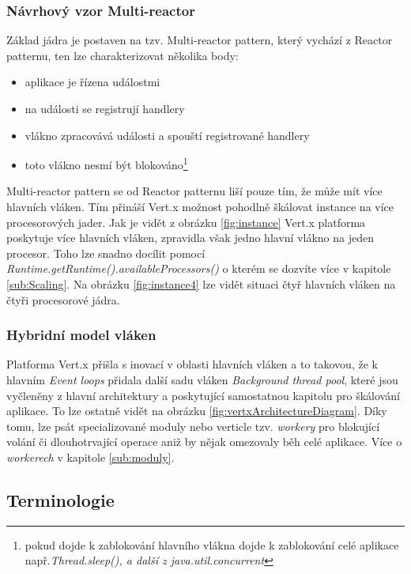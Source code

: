 \subsubsection{Návrhový vzor Multi-reactor}\label{sub:multireactor}

Základ jádra je postaven na tzv. Multi-reactor pattern\cite{eventLoops}, 
který vychází z Reactor patternu\cite{reactorPattern}, ten lze charakterizovat několika body:

\begin{itemize}
\item{aplikace je řízena událostmi}
\item{na události se registrují handlery}
\item{vlákno zpracovává události a spouští registrované handlery}
\item{toto vlákno nesmí být blokováno\footnote{pokud dojde k zablokování hlavního vlákna dojde k zablokování celé aplikace např.\emph{Thread.sleep(), a další z java.util.concurrent }}}
\end{itemize}

Multi-reactor pattern\cite{eventLoops} se od Reactor patternu liší pouze tím, že může mít více hlavních vláken. Tím přináší Vert.x možnost pohodlně škálovat instance na více procesorových jader. Jak je vidět z obrázku \vref{fig:instance} Vert.x platforma poskytuje více hlavních vláken, zpravidla však jedno hlavní vlákno na jeden procesor. Toho lze snadno docílit pomocí \emph{Runtime.getRuntime().availableProcessors()} o kterém se dozvíte více v kapitole \ref{sub:Scaling}. Na obrázku \vref{fig:instance4} lze vidět situaci čtyř hlavních vláken na čtyři procesorové jádra.

\subsubsection{Hybridní model vláken}\label{sub:hybrid}

Platforma Vert.x přišla s inovací v oblasti hlavních vláken a to takovou, že k hlavním \emph{Event loops} přidala další sadu vláken \emph{Background thread pool}, které jsou vyčleněny z hlavní architektury a poskytující samostatnou kapitolu pro škálování aplikace. To lze ostatně vidět na obrázku \vref{fig:vertxArchitectureDiagram}. Díky tomu, lze psát specializované moduly nebo verticle tzv. \emph{workery} pro blokující volání či dlouhotrvající operace aniž by nějak omezovaly běh celé aplikace. Více o \emph{workerech} v kapitole \ref{sub:moduly}.

\subsection{Terminologie}

